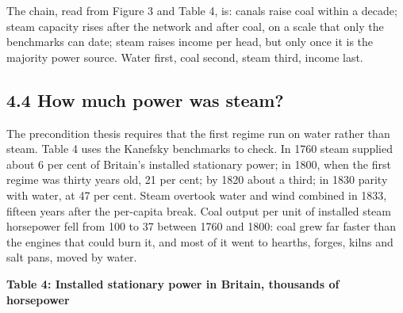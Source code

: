 \documentclass[
  11pt,
]{article}
\begin{document}
The chain, read from Figure 3 and Table 4, is: canals raise coal within
a decade; steam capacity rises after the network and after coal, on a
scale that only the benchmarks can date; steam raises income per head,
but only once it is the majority power source. Water first, coal second,
steam third, income last.

\subsection{4.4 How much power was
steam?}\label{how-much-power-was-steam}

The precondition thesis requires that the first regime run on water
rather than steam. Table 4 uses the Kanefsky benchmarks to check. In
1760 steam supplied about 6 per cent of Britain's installed stationary
power; in 1800, when the first regime was thirty years old, 21 per cent;
by 1820 about a third; in 1830 parity with water, at 47 per cent. Steam
overtook water and wind combined in 1833, fifteen years after the
per-capita break. Coal output per unit of installed steam horsepower
fell from 100 to 37 between 1760 and 1800: coal grew far faster than the
engines that could burn it, and most of it went to hearths, forges,
kilns and salt pans, moved by water.

\textbf{Table 4: Installed stationary power in Britain, thousands of
horsepower}
\end{document}

